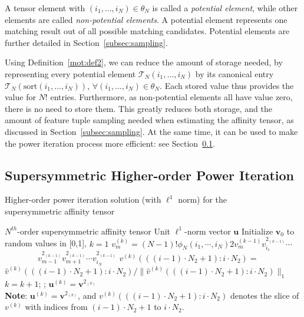 A tensor element with $(i_1,\ldots,i_N)\in \theta_N$ is called a \emph{potential element}, while other elements are called \emph{non-potential elements}.
A potential element represents one matching result out of all possible matching candidates.
Potential elements are further detailed in  Section~\ref{subsec:sampling}.

Using Definition~\ref{mot:def2}, we can reduce the amount of storage needed,
by representing every potential element $\mathcal{T}_N(i_1,\ldots,i_N)$ by its canonical entry $\mathcal{T}_N(\mathrm{sort}(i_1,\ldots,i_N))$, $\forall (i_1,\ldots,i_N)\in \theta_N$.
Each stored value thus provides the value for $N!$ entries.
Furthermore, as non-potential elements all have value zero, there is no need to store them.
This greatly reduces both storage, and the amount of feature tuple sampling
needed when estimating the affinity tensor, as discussed in Section~\ref{subsec:sampling}.
At the same time, it can be used to make the power iteration process more efficient: see Section~\ref{subsec:oursymmhopm}.

\subsection{Supersymmetric Higher-order Power Iteration}
\label{subsec:oursymmhopm}

\begin{algorithm}[!t]
\caption{\small Higher-order power iteration solution (with $\mathcal{\ell}^1$ norm) for the \protect\\
         \mbox{}\hspace{15ex}\small supersymmetric affinity tensor }
\label{alg2}
\begin{algorithmic}[1]
\REQUIRE \small $N^{th}$-order supersymmetric affinity tensor
\ENSURE  \small Unit $\mathcal{\ell}^1$-norm vector $\boldsymbol{u}$
\STATE   \small \; Initialize $\boldsymbol{v}_0$ to random values in [0,1], $k=1$
\REPEAT
        \STATE $v_{m}^{(k)}=(N-1)!\phi_N(i_1,\cdots , i_N) 2v_{m}^{(k-1)}v_{i_1}^{2_{(k-1)}}\cdots$ \\
                 $\qquad \qquad v_{m-1}^{2_{(k-1)}}v_{m+1}^{2_{(k-1)}}\cdots v_{i_N}^{2_{(k-1)}}$
        \ENDFOR
        \STATE $v^{(k)}(((i-1)\cdot N_2+1) : i\cdot N_2)=$   \protect\\
               $\hat{v}^{(k)}(((i-1)\cdot N_2+1) : i\cdot N_2)/\lVert \hat{v}^{(k)}(((i-1)\cdot N_2+1):i\cdot N_2)\lVert_1$
        \ENDFOR
    \ENDFOR
    \STATE $k=k+1$;
;
\STATE   \small \; $\boldsymbol{u}^{(k)}=\boldsymbol{v}^{2_{(k)}}$ \protect\\
       \small \textbf{Note}: $\boldsymbol{u}^{(k)}=\boldsymbol{v}^{2_{(k)}}$,
       \small and $v^{(k)}(((i-1)\cdot N_2+1) : i\cdot N_2)$ denotes the slice of $v^{(k)}$ with
       \small indices from $(i-1)\cdot N_2+1$ to $i\cdot N_2$.
\end{algorithmic}
\end{algorithm}

